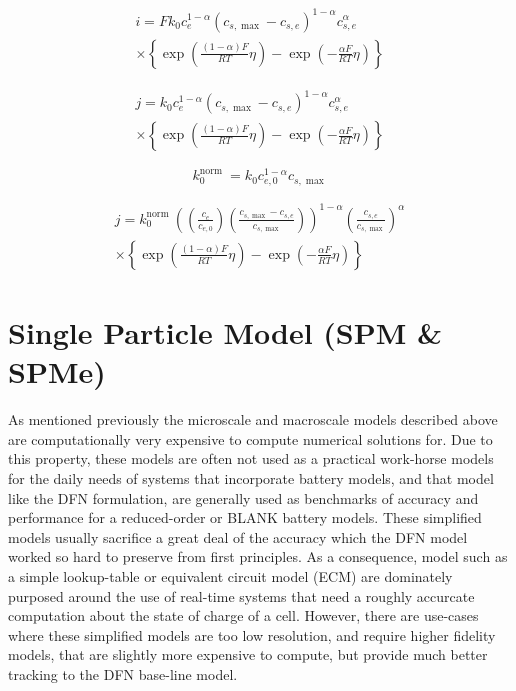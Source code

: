 \documentclass[lettersize,journal]{IEEEtran}
\begin{document}
\begin{equation}
  \begin{array}{c}

    i=F k_{0} c_{e}^{1-\alpha}\left(c_{s, \max }-c_{s, e}\right)^{1-\alpha} c_{s, e}^{\alpha} \\
    \times\left\{\exp \left(\frac{(1-\alpha) F}{R T} \eta\right)-\exp \left(-\frac{\alpha F}{R T} \eta\right)\right\}

  \end{array}
\end{equation}

\begin{equation}
\begin{array}{c}
  j=k_{0} c_{e}^{1-\alpha}\left(c_{s, \max }-c_{s, e}\right)^{1-\alpha} c_{s, e}^{\alpha} \\
  \times\left\{\exp \left(\frac{(1-\alpha) F}{R T} \eta\right)-\exp \left(-\frac{\alpha F}{R T} \eta\right)\right\}
\end{array}
\end{equation}


\begin{equation}
  k_{0}^{\text {norm }} = {k_{0} c_{e, 0}^{1-\alpha} c_{s, \max }}
\end{equation}

\begin{equation}
\begin{array}{c}
j=k_{0}^{\text {norm }}\left(\left(\frac{c_{e}}{c_{e, 0}}\right)\left(\frac{c_{s, \max }-c_{s, e}}{c_{s, \max }}\right)\right)^{1-\alpha}\left(\frac{c_{s, e}}{c_{s, \max }}\right)^{\alpha} \\
\times\left\{\exp \left(\frac{(1-\alpha) F}{R T} \eta\right)-\exp \left(-\frac{\alpha F}{R T} \eta\right)\right\}
\end{array}
\end{equation}

\section{Single Particle Model (SPM \& SPMe)}

As mentioned previously the microscale and macroscale models described above are computationally very expensive to compute numerical solutions for. Due to this property, these models are often not used as a practical work-horse models for the daily needs of systems that incorporate battery models, and that model like the DFN formulation, are generally used as benchmarks of accuracy and performance for a reduced-order or BLANK battery models. These simplified models usually sacrifice a great deal of the accuracy which the DFN model worked so hard to preserve from first principles. As a consequence, model such as a simple lookup-table or equivalent circuit model (ECM) are dominately purposed around the use of real-time systems that need a roughly accurcate computation about the state of charge of a cell. However, there are use-cases where these simplified models are too low resolution, and require higher fidelity models, that are slightly more expensive to compute, but provide much better tracking to the DFN base-line model. \\
\end{document}
